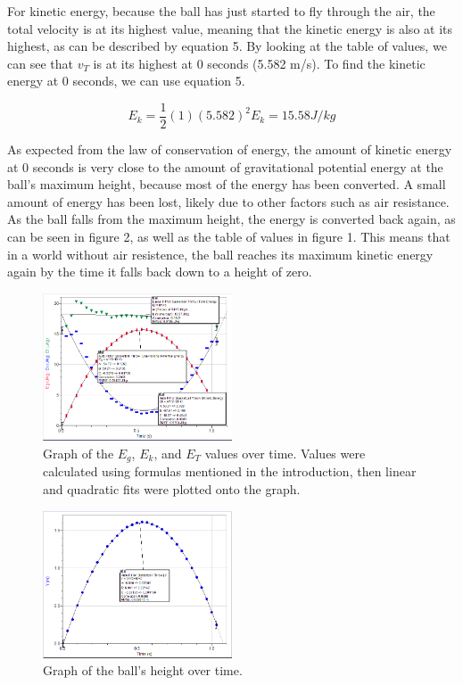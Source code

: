 \documentclass[10pt,twocolumn,letterpaper]{article}
\begin{document}
For kinetic energy, because the ball has just started to fly through the air, the total velocity is at its highest value, meaning that the kinetic energy is also at its highest, as can be described by equation 5. By looking at the table of values, we can see that \(v_{T}\) is at its highest at 0 seconds (5.582 m/s). To find the kinetic energy at 0 seconds, we can use equation 5. 

\begin{equation}
    E_{k}=\frac{1}{2}(1)(5.582)^2
    E_{k}=15.58 J/kg
\end{equation}

As expected from the law of conservation of energy, the amount of kinetic energy at 0 seconds is very close to the amount of gravitational potential energy at the ball's maximum height, because most of the energy has been converted. A small amount of energy has been lost, likely due to other factors such as air resistance. As the ball falls from the maximum height, the energy is converted back again, as can be seen in figure 2, as well as the table of values in figure 1. This means that in a world without air resistence, the ball reaches its maximum kinetic energy again by the time it falls back down to a height of zero.

\begin{figure}
  \centering
  \includegraphics[width=0.5\textwidth]{figures/LoggerPro_pxxYVWhf00.png}
  \caption{Graph of the \(E_{g}\), \(E_{k}\), and \(E_{T}\) values over time. Values were calculated using formulas mentioned in the introduction, then linear and quadratic fits were plotted onto the graph.}
\end{figure}

\begin{figure}
  \centering
  \includegraphics[width=0.5\textwidth]{figures/LoggerPro_twD1Xz5EFQ.png}
  \caption{Graph of the ball's height over time.}
\end{figure}
\end{document}
